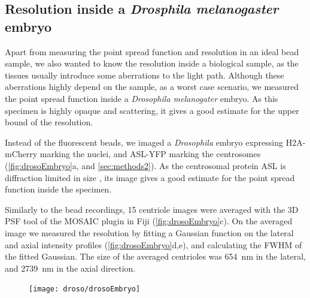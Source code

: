   \subsection{Resolution inside a \textit{Drosphila melanogaster} embryo}

    Apart from measuring the point spread function and resolution in an ideal bead sample, we also wanted to know the resolution inside a biological sample, as the tissues usually introduce some aberrations to the light path. Although these aberrations highly depend on the sample, as a worst case scenario, we measured the point spread function inside a \textit{Drosophila melanogater} embryo. As this specimen is highly opaque and scattering, it gives a good estimate for the upper bound of the resolution.

    Instead of the fluorescent beads, we imaged a \textit{Drosophila} embryo expressing H2A-mCherry marking the nuclei, and ASL-YFP marking the centrosomes (\autoref{fig:drosoEmbryo}a, and \autoref{sec:methods2}). As the centrosomal protein ASL is diffraction limited in size \cite{gonczy_towards_2012}, its image gives a good estimate for the point spread function inside the specimen.

    Similarly to the bead recordings, 15 centriole images were averaged with the 3D PSF tool of the MOSAIC plugin in Fiji (\autoref{fig:drosoEmbryo}c). On the averaged image we measured the resolution by fitting a Gaussian function on the lateral and axial intensity profiles (\autoref{fig:drosoEmbryo}d,e), and calculating the FWHM of the fitted Gaussian. The size of the averaged centrioles was \SI{654}{nm} in the lateral, and \SI{2739}{nm} in the axial direction.

    \begin{figure}[ptb]
      \centering
      \texttt{[image: droso/drosoEmbryo]}
      \label{fig:drosoEmbryo}
    \end{figure}
    
